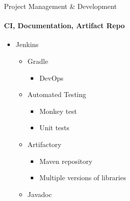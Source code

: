 \begin{frame}[t]{Project Management \& Development}\framesubtitle{CI, Documentation, Artifact Repo}
    \begin{itemize}
        \item Jenkins
        \begin{itemize}
            \item Gradle
            \begin{itemize}
                \item DevOps
            \end{itemize}
            \item Automated Testing
            \begin{itemize}
                \item Monkey test
                \item Unit tests
            \end{itemize}
            \item Artifactory
            \begin{itemize}
                \item Maven repository
                \item Multiple versions of libraries
            \end{itemize}
            \item Javadoc
        \end{itemize}
    \end{itemize}
\end{frame}
